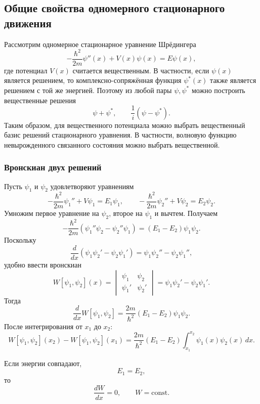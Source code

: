 \documentclass[12pt,a4paper]{article}
\begin{document}
\subsection{Общие свойства одномерного стационарного движения}

Рассмотрим одномерное стационарное уравнение Шрёдингера
\[
    -\frac{\hbar^2}{2m}\psi''(x)+V(x)\psi(x)=E\psi(x),
\]
где потенциал $V(x)$ считается вещественным. В частности, если $\psi(x)$
является решением, то комплексно-сопряжённая функция $\psi^*(x)$ также
является решением с той же энергией. Поэтому из любой пары
$\psi,\psi^*$ можно построить вещественные решения
\[
    \psi+\psi^*,
    \qquad
    \frac{1}{i}\left(\psi-\psi^*\right).
\]
Таким образом, для вещественного потенциала можно выбрать вещественный
базис решений стационарного уравнения. В частности, волновую функцию
невырожденного связанного состояния можно выбрать вещественной.

\subsubsection{Вронскиан двух решений}

Пусть $\psi_1$ и $\psi_2$ удовлетворяют уравнениям
\[
    -\frac{\hbar^2}{2m}\psi_1''+V\psi_1=E_1\psi_1,
    \qquad
    -\frac{\hbar^2}{2m}\psi_2''+V\psi_2=E_2\psi_2.
\]
Умножим первое уравнение на $\psi_2$, второе на $\psi_1$ и вычтем.
Получаем
\[
    -\frac{\hbar^2}{2m}
    \left(
        \psi_1''\psi_2-\psi_2''\psi_1
    \right)
    =
    (E_1-E_2)\psi_1\psi_2.
\]
Поскольку
\[
    \frac{d}{dx}
    \left(
        \psi_1\psi_2'
        -
        \psi_2\psi_1'
    \right)
    =
    \psi_1\psi_2''
    -
    \psi_2\psi_1'',
\]
удобно ввести вронскиан
\[
    \boxed{
        W[\psi_1,\psi_2](x)
        =
        \begin{vmatrix}
            \psi_1 & \psi_2\\
            \psi_1' & \psi_2'
        \end{vmatrix}
        =
        \psi_1\psi_2'-\psi_2\psi_1'
    }.
\]
Тогда
\[
    \boxed{
        \frac{d}{dx}W[\psi_1,\psi_2]
        =
        \frac{2m}{\hbar^2}
        (E_1-E_2)\psi_1\psi_2
    }.
\]
После интегрирования от $x_1$ до $x_2$:
\[
    \boxed{
    W[\psi_1,\psi_2](x_2)
    -
    W[\psi_1,\psi_2](x_1)
    =
    \frac{2m}{\hbar^2}
    (E_1-E_2)
    \int_{x_1}^{x_2}
        \psi_1(x)\psi_2(x)\,dx
    }.
\]

Если энергии совпадают,
\[
    E_1=E_2,
\]
то
\[
    \frac{dW}{dx}=0,
    \qquad
    W=\mathrm{const}.
\]
\end{document}
